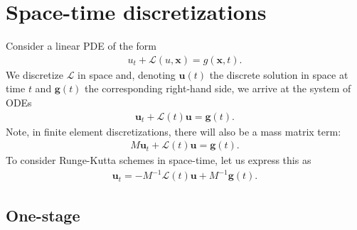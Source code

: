 \documentclass[a4paper,10pt]{article}
\begin{document}
\allowdisplaybreaks


\section{Space-time discretizations}\label{sec:disc}

Consider a linear PDE of the form 
\begin{align*}
u_t + \mathcal{L}(u,\mathbf{x}) = g(\mathbf{x},t).
\end{align*}
We discretize $\mathcal{L}$ in space and, denoting $\mathbf{u}(t)$ the discrete solution in space at time $t$
and $\mathbf{g}(t)$ the corresponding right-hand side, we arrive at the system of ODEs 
%
\begin{align}\label{eq:ode}
\mathbf{u}_t + \mathcal{L}(t)\mathbf{u} = \mathbf{g}(t).
\end{align}
%
Note, in finite element discretizations, there will also be a mass matrix term:
%
\begin{align*}
M\mathbf{u}_t + \mathcal{L}(t)\mathbf{u} = \mathbf{g}(t).
\end{align*}
%
To consider Runge-Kutta schemes in space-time, let us express this as
%
\begin{align}\label{eq:odeM}
\mathbf{u}_t= -M^{-1}\mathcal{L}(t)\mathbf{u} + M^{-1}\mathbf{g}(t).
\end{align}
%

\subsection{One-stage}
\end{document}
